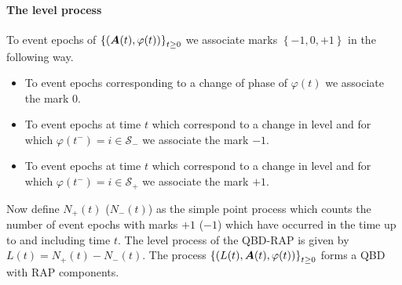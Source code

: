 \paragraph{The level process}
To event epochs of \(\left\{(\boldsymbol A(t),{\varphi}(t))\right\}_{t\geq0}\) we associate marks \(\left\{-1,0,+1\right\}\) in the following way.
\begin{itemize}
	\item To event epochs corresponding to a change of phase of \( {\varphi}(t)\) we associate the mark \(0\).
	\item To event epochs at time \(t\) which correspond to a change in level and for which \( {\varphi}(t^-)=i\in\mathcal S_-\) we associate the mark \(-1\).
	\item To event epochs at time \(t\) which correspond to a change in level and for which \( {\varphi}(t^-)=i\in\mathcal S_+\) we associate the mark \(+1\).
\end{itemize}
Now define \(N_+(t)\) (\(N_-(t)\)) as the simple point process which counts the number of event epochs with marks \(+1\) (\(-1\)) which have occurred in the time up to and including time \(t\). The level process of the QBD-RAP is given by \( L(t) = N_+(t)-N_-(t)\). The process \(\left\{(L(t),\boldsymbol A(t),\varphi(t))\right\}_{t\geq 0}\) forms a QBD with RAP components.

